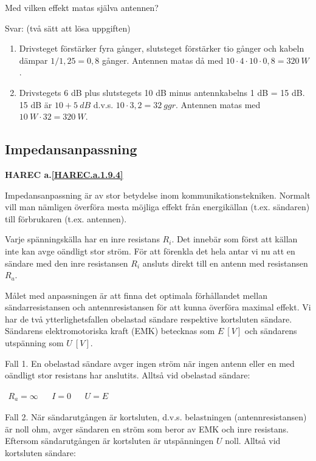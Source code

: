 Med vilken effekt matas själva antennen?

Svar: (två sätt att lösa uppgiften)
\begin{enumerate}
\item Drivsteget förstärker fyra gånger, slutsteget förstärker tio gånger och
kabeln dämpar \(1/1,25 = 0,8\) gånger. Antennen matas då med
\(10 \cdot 4 \cdot 10 \cdot 0,8 = 320\ W\).
\item Drivstegets 6 dB plus slutstegets 10 dB minus antennkabelns 1 dB = 15 dB.
15 dB är \(10 + 5\ dB\) d.v.s. \(10 \cdot 3,2 = 32\ ggr\). Antennen matas med
\(10\ W \cdot 32 = 320\ W\).
\end{enumerate}

\subsection{Impedansanpassning}
\textbf{HAREC a.\ref{HAREC.a.1.9.4}\label{myHAREC.a.1.9.4}}

Impedansanpassning är av stor betydelse inom kommunikationstekniken.
Normalt vill man nämligen överföra mesta möjliga effekt från energikällan
(t.ex. sändaren) till förbrukaren (t.ex. antennen).

Varje spänningskälla har en inre resistans \(R_i\). Det innebär som först att
källan inte kan avge oändligt stor ström. För att förenkla det hela antar vi nu
att en sändare med den inre resistansen \(R_i\) ansluts direkt till en antenn
med resistansen \(R_a\).

Målet med anpassningen är att finna det optimala förhållandet mellan
sändarresistansen och antennresistansen för att kunna överföra maximal effekt.
Vi har de två ytterlighetsfallen obelastad sändare respektive kortsluten
sändare. Sändarens elektromotoriska kraft (EMK) betecknas som \(E\ [V]\) och
sändarens utspänning som \(U\ [V]\).

Fall 1.
En obelastad sändare avger ingen ström när ingen antenn eller en med oändligt
stor resistans har anslutits.
Alltså vid obelastad sändare:

\(
\begin{array}{lllll}
R_a = \infty & & I = 0 & & U = E
\end{array}
\)

Fall 2.
När sändarutgången är kortsluten, d.v.s. belastningen (antennresistansen) är
noll ohm, avger sändaren en ström som beror av EMK och inre resistans. Eftersom
sändarutgången är kortsluten är utspänningen \(U\) noll.
Alltså vid kortsluten sändare:

